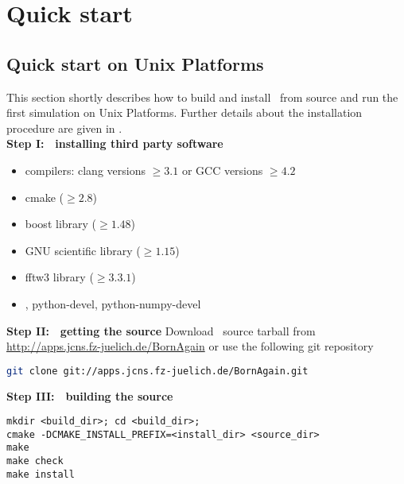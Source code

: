 \newpage
\chapter{Quick start} 

\section{Quick start on Unix Platforms}

This section shortly describes how to build and install \BornAgain\ 
from source and run the first simulation on Unix Platforms. 
Further details about the installation procedure are given in . \\

\noindent
{\bf Step I: $~$ installing third party software}
\begin{itemize}
\item compilers: clang  versions $\geq 3.1$ or GCC versions $\geq 4.2$
\item cmake ($\geq 2.8$)
\item boost library ($\geq 1.48$)
\item GNU scientific library ($\geq 1.15$)
\item fftw3 library ($\geq 3.3.1$)
\item {}, python-devel, python-numpy-devel
\end{itemize}
\vspace*{2mm}


\noindent
{\bf Step II: $~$ getting the source} \newline
Download \BornAgain\ source tarball from \url{http://apps.jcns.fz-juelich.de/BornAgain}
or use the following git repository
\begin{lstlisting}[language=bash, style=commandline]
git clone git://apps.jcns.fz-juelich.de/BornAgain.git 
\end{lstlisting}

\vspace*{3mm}



\noindent
{\bf Step III: $~$ building the source}
\begin{lstlisting}[language=shell, style=commandline]
mkdir <build_dir>; cd <build_dir>;
cmake -DCMAKE_INSTALL_PREFIX=<install_dir> <source_dir>
make
make check
make install
\end{lstlisting}
\vspace*{3mm}



